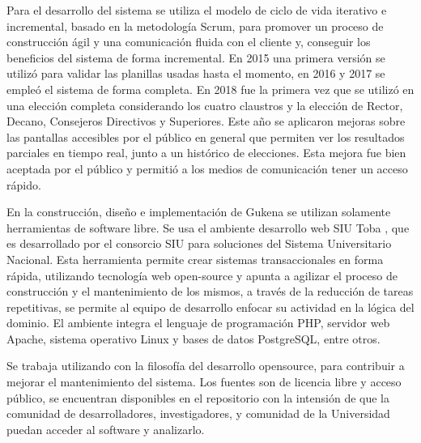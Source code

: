 Para el desarrollo del sistema se utiliza el modelo de ciclo de vida iterativo e incremental, basado en la metodología Scrum, para promover un proceso de construcción ágil y una comunicación fluida con el cliente y, conseguir los beneficios del sistema de forma incremental. En 2015 una primera versión se utilizó para validar las planillas usadas hasta el momento, en 2016 y 2017 se empleó el sistema de forma completa.  En 2018 fue la primera vez que se utilizó en una elección completa considerando los cuatro claustros y la elección de Rector, Decano, Consejeros Directivos y Superiores. Este año se aplicaron mejoras sobre las pantallas accesibles por el público en general que permiten ver los resultados parciales en tiempo real, junto a un histórico de elecciones. Esta mejora fue bien aceptada por el público y permitió a los medios de comunicación tener un acceso rápido.

En la construcción, diseño e implementación de Gukena se utilizan solamente herramientas de software libre. Se usa el ambiente desarrollo web SIU Toba \cite{toba}, que es desarrollado por el consorcio SIU para soluciones del Sistema Universitario Nacional. Esta herramienta  permite crear sistemas transaccionales en forma rápida, utilizando tecnología web open-source y apunta a agilizar el proceso de construcción y el mantenimiento de los mismos, a través de la reducción de tareas repetitivas, se permite al equipo de desarrollo enfocar su actividad en la lógica del dominio.  El ambiente integra el lenguaje de programación PHP, servidor web Apache, sistema operativo Linux y bases de datos PostgreSQL, entre otros.

Se trabaja utilizando con la filosofía del desarrollo opensource, para contribuir a mejorar el mantenimiento del sistema. Los fuentes son de licencia libre y acceso público, se encuentran disponibles en el repositorio \cite{github} con la intensión  de que la comunidad de desarrolladores, investigadores, y comunidad de la Universidad puedan acceder al software y analizarlo.

